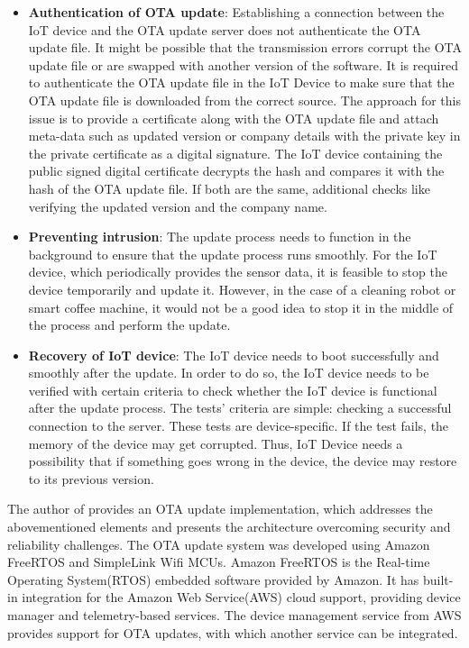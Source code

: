 \documentclass[12pt,a4paper]{article}
\begin{document}
\begin{itemize}
\item \textbf{Authentication of OTA update}: Establishing a connection between the IoT device and the OTA update server does not authenticate the OTA update file. It might be possible that the transmission errors corrupt the OTA update file or are swapped with another version of the software. It is required to authenticate the OTA update file in the IoT Device to make sure that the OTA update file is downloaded from the correct source. The approach for this issue is to provide a certificate along with the OTA update file and attach meta-data such as updated version or company details with the private key in the private certificate as a digital signature. The IoT device containing the public signed digital certificate decrypts the hash and compares it with the hash of the OTA update file. If both are the same, additional checks like verifying the updated version and the company name. \cite{r27}

\item \textbf{Preventing intrusion}: The update process needs to function in the background to ensure that the update process runs smoothly. For the IoT device, which periodically provides the sensor data, it is feasible to stop the device temporarily and update it. However, in the case of a cleaning robot or smart coffee machine, it would not be a good idea to stop it in the middle of the process and perform the update. \cite{r27}

\item \textbf{Recovery of IoT device}: The IoT device needs to boot successfully and smoothly after the update. In order to do so, the IoT device needs to be verified with certain criteria to check whether the IoT device is functional after the update process. The tests' criteria are simple: checking a successful connection to the server. These tests are device-specific. If the test fails, the memory of the device may get corrupted. Thus, IoT Device needs a possibility that if something goes wrong in the device, the device may restore to its previous version. \cite{r27}

\end{itemize}

The author of \cite{r27} provides an OTA update implementation, which addresses the abovementioned elements and presents the architecture overcoming security and reliability challenges. The OTA update system was developed using Amazon FreeRTOS and SimpleLink Wifi MCUs. Amazon FreeRTOS is the Real-time Operating System(RTOS) embedded software provided by Amazon. It has built-in integration for the Amazon Web Service(AWS) cloud support, providing device manager and telemetry-based services. The device management service from AWS provides support for OTA updates, with which another service can be integrated. \cite{r27}
\end{document}
